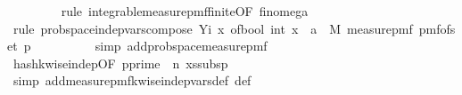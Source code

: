 \begin{isabellebody}
\ \ \ \ \ \ \ \isamarkupfalse%
\ {\isacharparenleft}{\kern0pt}rule\ integrable{\isacharunderscore}{\kern0pt}measure{\isacharunderscore}{\kern0pt}pmf{\isacharunderscore}{\kern0pt}finite{\isacharbrackleft}{\kern0pt}OF\ fin{\isacharunderscore}{\kern0pt}omega{\isacharunderscore}{\kern0pt}{}{\isacharbrackright}{\kern0pt}{\isacharparenright}{\kern0pt}\isanewline
\ \ \ \ \ \ \isamarkupfalse%
\ {\isacharparenleft}{\kern0pt}rule\ prob{\isacharunderscore}{\kern0pt}space{\isachardot}{\kern0pt}indep{\isacharunderscore}{\kern0pt}vars{\isacharunderscore}{\kern0pt}compose{}{\isacharbrackleft}{\kern0pt}\ Y{\isacharequal}{\kern0pt}{\isachardoublequoteopen}{\isasymlambda}i\ x{\isachardot}{\kern0pt}\ of{\isacharunderscore}{\kern0pt}bool\ {\isacharparenleft}{\kern0pt}int\ x\ {\isasymle}\ a{\isacharparenright}{\kern0pt}{\isachardoublequoteclose}\ \ M{\isacharprime}{\kern0pt}{\isacharequal}{\kern0pt}{\isachardoublequoteopen}{\isasymlambda}{\isacharunderscore}{\kern0pt}{\isachardot}{\kern0pt}\ measure{\isacharunderscore}{\kern0pt}pmf\ {\isacharparenleft}{\kern0pt}pmf{\isacharunderscore}{\kern0pt}of{\isacharunderscore}{\kern0pt}set\ {\isacharbraceleft}{\kern0pt}{}{\isachardot}{\kern0pt}{\isachardot}{\kern0pt}{\isacharless}{\kern0pt}p{\isacharbraceright}{\kern0pt}{\isacharparenright}{\kern0pt}{\isachardoublequoteclose}{\isacharbrackright}{\kern0pt}{\isacharparenright}{\kern0pt}\isanewline
\ \ \ \ \ \ \ \ \isamarkupfalse%
\ {\isacharparenleft}{\kern0pt}simp\ add{\isacharcolon}{\kern0pt}prob{\isacharunderscore}{\kern0pt}space{\isacharunderscore}{\kern0pt}measure{\isacharunderscore}{\kern0pt}pmf{\isacharparenright}{\kern0pt}\isanewline
\ \ \ \ \ \ \ \isamarkupfalse%
\ hash{\isacharunderscore}{\kern0pt}k{\isacharunderscore}{\kern0pt}wise{\isacharunderscore}{\kern0pt}indep{\isacharbrackleft}{\kern0pt}OF\ p{\isacharunderscore}{\kern0pt}prime{\isacharcomma}{\kern0pt}\ \ n{\isacharequal}{\kern0pt}{\isachardoublequoteopen}{}{\isachardoublequoteclose}{\isacharbrackright}{\kern0pt}\ xs{\isacharunderscore}{\kern0pt}subs{\isacharunderscore}{\kern0pt}p\isanewline
\ \ \ \ \ \ \ \isamarkupfalse%
\ {\isacharparenleft}{\kern0pt}simp\ add{\isacharcolon}{\kern0pt}measure{\isacharunderscore}{\kern0pt}pmf{\isachardot}{\kern0pt}k{\isacharunderscore}{\kern0pt}wise{\isacharunderscore}{\kern0pt}indep{\isacharunderscore}{\kern0pt}vars{\isacharunderscore}{\kern0pt}def\ {\isasymOmega}def{\isacharparenright}{\kern0pt}\ \isanewline

\end{isabellebody}
